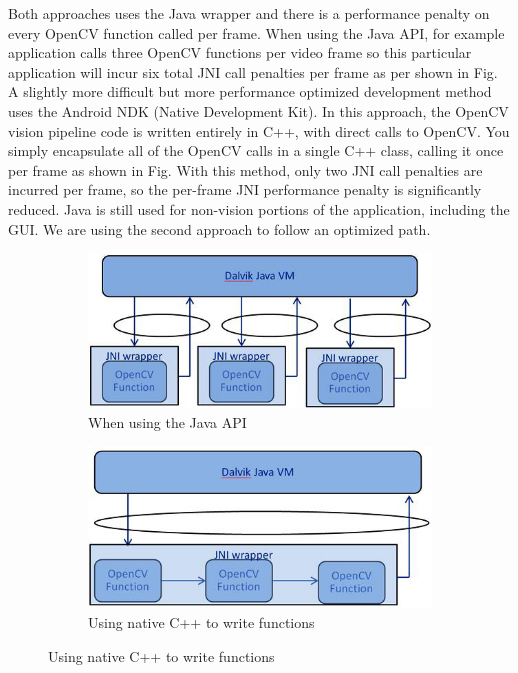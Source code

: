 Both approaches uses the Java wrapper and there is a performance penalty on every OpenCV function called per frame. When using the Java API, for example application calls three OpenCV functions per video frame so this particular application will incur six total JNI call penalties per frame as per shown in Fig. A slightly more difficult but more performance optimized development method uses the Android NDK (Native Development Kit). In this approach, the OpenCV vision pipeline code is written entirely in C++, with direct calls to OpenCV. You simply encapsulate all of the OpenCV calls in a single C++ class, calling it once per frame as shown in Fig. With this method, only two JNI call penalties are incurred per frame, so the per-frame JNI performance penalty is significantly reduced. Java is still used for non-vision portions of the application, including the GUI. We are using the second approach to follow an optimized path. 


\begin{figure}[H][t]
\begin{subfigure}[b]{0.5\textwidth}
\centering
\includegraphics[width=0.85\linewidth]{img/lane12.png}
\caption{When using the Java API}
\label{fig:lane12}
\end{subfigure}
\begin{subfigure}[b]{0.5\textwidth}
\centering
\includegraphics[width=0.85\linewidth]{img/lane13.png}
\caption{Using native C++ to write functions}
\label{fig:lane13}
\end{subfigure}
\end{figure}

